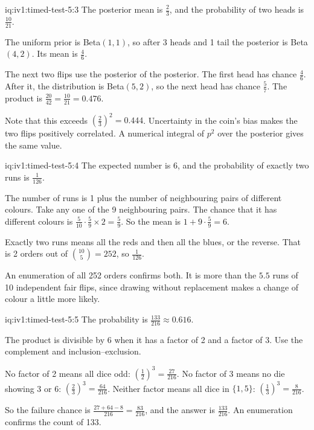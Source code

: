 \begin{solution}{iq:iv1:timed-test-5:3}
The posterior mean is $\frac23$, and the probability of two heads is $\frac{10}{21}$.

The uniform prior is Beta$(1, 1)$, so after 3 heads and 1 tail the posterior is Beta$(4, 2)$. Its mean is $\frac46$.

The next two flips use the posterior of the posterior. The first head has chance $\frac46$. After it, the distribution is Beta$(5, 2)$, so the next head has chance $\frac57$. The product is $\frac{20}{42} = \frac{10}{21} = 0.476$.

Note that this exceeds $(\frac23)^2 = 0.444$. Uncertainty in the coin's bias makes the two flips positively correlated. A numerical integral of $p^2$ over the posterior gives the same value.

\end{solution}

\begin{solution}{iq:iv1:timed-test-5:4}
The expected number is 6, and the probability of exactly two runs is $\frac{1}{126}$.

The number of runs is 1 plus the number of neighbouring pairs of different colours. Take any one of the 9 neighbouring pairs. The chance that it has different colours is $\frac{5}{10}\cdot\frac{5}{9} \times 2 = \frac59$. So the mean is $1 + 9 \cdot \frac59 = 6$.

Exactly two runs means all the reds and then all the blues, or the reverse. That is 2 orders out of $\binom{10}{5} = 252$, so $\frac{1}{126}$.

An enumeration of all 252 orders confirms both. It is more than the $5.5$ runs of 10 independent fair flips, since drawing without replacement makes a change of colour a little more likely.

\end{solution}

\begin{solution}{iq:iv1:timed-test-5:5}
The probability is $\frac{133}{216} \approx 0.616$.

The product is divisible by 6 when it has a factor of 2 and a factor of 3. Use the complement and inclusion--exclusion.

No factor of 2 means all dice odd: $(\frac12)^3 = \frac{27}{216}$. No factor of 3 means no die showing 3 or 6: $(\frac23)^3 = \frac{64}{216}$. Neither factor means all dice in $\{1, 5\}$: $(\frac13)^3 = \frac{8}{216}$.

So the failure chance is $\frac{27 + 64 - 8}{216} = \frac{83}{216}$, and the answer is $\frac{133}{216}$. An enumeration confirms the count of 133.

\end{solution}

